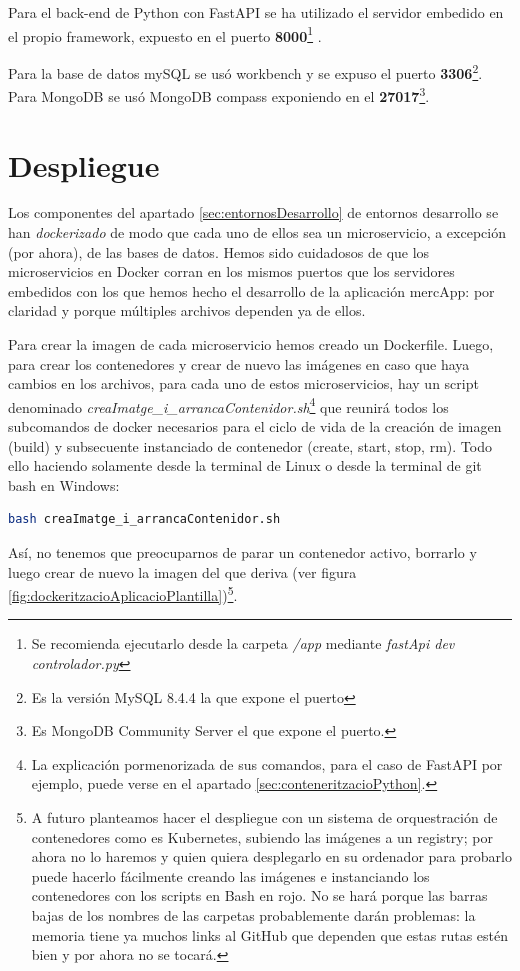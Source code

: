 \documentclass[a4paper,12pt]{report}
\begin{document}
				Para el back-end de Python con FastAPI se ha utilizado el servidor embedido en el propio framework, expuesto en el puerto \textbf{8000}\footnote{Se recomienda ejecutarlo desde la carpeta \textit{/app} mediante \textit{fastApi dev controlador.py}} .
				
				Para la base de datos mySQL se usó workbench y se expuso el puerto \textbf{3306}\footnote{Es la versión MySQL 8.4.4 la que expone el puerto}. Para MongoDB se usó MongoDB compass exponiendo en el \textbf{27017}\footnote{Es MongoDB Community Server el que expone el puerto.}.
		
	
			\section{Despliegue}
			\label{sec:despliegue}
				Los componentes del apartado \ref{sec:entornosDesarrollo} de entornos  desarrollo se han \textit{dockerizado} de modo que cada uno de ellos sea un microservicio, a excepción (por ahora), de las bases de datos. Hemos sido cuidadosos de que los microservicios en Docker corran en los mismos puertos que los servidores embedidos con los que hemos hecho el desarrollo de la aplicación mercApp: por claridad y porque múltiples archivos dependen ya de ellos.
				
				Para crear la imagen de cada microservicio hemos creado un Dockerfile. Luego, para crear los contenedores y crear de nuevo las imágenes en caso que haya cambios en los archivos, para cada uno de estos microservicios, hay un script denominado \textit{creaImatge\_i\_arrancaContenidor.sh}\footnote{La explicación pormenorizada de sus comandos, para el caso de FastAPI por ejemplo, puede verse en el apartado \ref{sec:conteneritzacioPython}.} que reunirá todos los subcomandos de docker necesarios para el ciclo de vida de la creación de imagen (build) y subsecuente instanciado de contenedor (create, start, stop, rm). Todo ello haciendo solamente desde la terminal de Linux o desde la terminal de git bash en Windows: 
				
				\begin{lstlisting}[language=bash]
	bash creaImatge_i_arrancaContenidor.sh
				\end{lstlisting}
				
				
				
				
				
				Así, no tenemos que preocuparnos de parar un contenedor activo, borrarlo y luego crear de nuevo la imagen del que deriva (ver figura \ref{fig:dockeritzacioAplicacioPlantilla})\footnote{ A futuro planteamos hacer el despliegue con un sistema de orquestración de contenedores como es Kubernetes, subiendo las imágenes a un registry; por ahora no lo haremos y quien quiera desplegarlo en su ordenador para probarlo puede hacerlo fácilmente creando las imágenes e instanciando los contenedores con los scripts en Bash en rojo. No se hará porque las barras bajas de los nombres de las carpetas probablemente darán problemas: la memoria tiene ya muchos links al GitHub que dependen que estas rutas estén bien y por ahora no se tocará.}.
				
\end{document}
